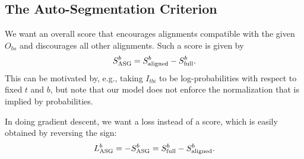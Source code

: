 \documentclass[a4paper]{article}
\begin{document}
\subsection{The Auto-Segmentation Criterion}
We want an overall score that encourages alignments compatible with the given $O_{bs}$ and discourages all other alignments. Such a score is given by
\begin{equation}
S^b_{\rm{ASG}} = S^b_{\rm{aligned}} - S^b_{\rm{full}}.
\end{equation}
This can be motivated by, e.g., taking $I_{tbi}$ to be log-probabilities with respect to fixed $t$ and $b$, but note that our model does not enforce the normalization that is implied by probabilities.

In doing gradient descent, we want a loss instead of a score, which is easily obtained by reversing the sign:
\begin{equation}
L^b_{\rm{ASG}} = -S^b_{\rm{ASG}} = S^b_{\rm{full}} - S^b_{\rm{aligned}}.
\end{equation}



\end{document}
